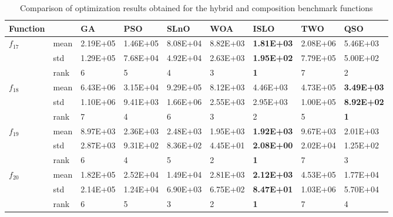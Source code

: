 \documentclass[a4paper,13pt,2p]{report}
\begin{document}
\begin{table}[!t]
\caption{Comparison of optimization results obtained for the hybrid and composition benchmark functions}
\label{tbl_results_hybrid_compos}
\begin{tabular}{|l|l|l|l|l|l|l|l|l|}
\hline
Function             &      & GA       & PSO      & SLnO     & WOA               & ISLO               & TWO      & QSO               \\ \hline
\multirow{3}{*}{$f_{17}$} & mean & 2.19E+05 & 1.46E+05 & 8.08E+04 & 8.82E+03          & \textbf{1.81E+03}  & 2.08E+06 & 5.46E+03          \\ \cline{2-9} 
                     & std  & 1.29E+05 & 7.68E+04 & 4.92E+04 & 2.63E+03          & \textbf{1.95E+02}  & 7.79E+05 & 5.00E+02          \\ \cline{2-9} 
                     & rank & 6        & 5        & 4        & 3                 & \textbf{1}         & 7        & 2                 \\ \hline
\multirow{3}{*}{$f_{18}$} & mean & 6.43E+06 & 3.15E+04 & 9.29E+05 & 8.12E+03          & 4.46E+03           & 4.73E+05 & \textbf{3.49E+03} \\ \cline{2-9} 
                     & std  & 1.10E+06 & 9.41E+03 & 1.66E+06 & 2.55E+03          & 2.95E+03           & 1.00E+05 & \textbf{8.92E+02} \\ \cline{2-9} 
                     & rank & 7        & 4        & 6        & 3                 & 2                  & 5        & \textbf{1}        \\ \hline
\multirow{3}{*}{$f_{19}$} & mean & 8.97E+03 & 2.36E+03 & 2.48E+03 & 1.95E+03          & \textbf{1.92E+03}  & 9.67E+03 & 2.01E+03          \\ \cline{2-9} 
                     & std  & 2.87E+03 & 9.31E+02 & 8.36E+02 & 4.45E+01          & \textbf{2.08E+00}  & 2.02E+04 & 1.25E+02          \\ \cline{2-9} 
                     & rank & 6        & 4        & 5        & 2                 & \textbf{1}         & 7        & 3                 \\ \hline
\multirow{3}{*}{$f_{20}$} & mean & 1.82E+05 & 2.52E+04 & 1.49E+04 & 2.81E+03          & \textbf{2.12E+03}  & 4.53E+05 & 1.77E+04          \\ \cline{2-9} 
                     & std  & 2.14E+05 & 1.24E+04 & 6.90E+03 & 6.75E+02          & \textbf{8.47E+01}  & 1.03E+06 & 5.70E+04          \\ \cline{2-9} 
                     & rank & 6        & 5        & 3        & 2                 & \textbf{1}         & 7        & 4                 \\ \hline

\end{tabular}
\end{table}
\end{document}
